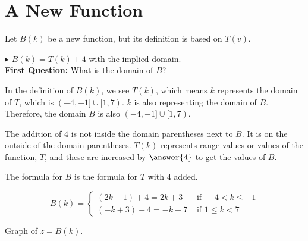 \documentclass{ximera}
\begin{document}
\section{A New Function}

Let $B(k)$ be a new function, but its definition is based on $T(v)$.


$\blacktriangleright$ $B(k) = T(k)+4$ with the implied domain. \\


\textbf{First Question:} What is the domain of $B$?

In the definition of $B(k)$, we see $T(k)$, which means $k$ represents the domain of $T$, which is $(-4,-1] \cup [1,7)$. $k$ is also representing the domain of $B$.  Therefore, the domain $B$ is also $(-4,-1] \cup [1,7)$.


The addition of $4$ is not inside the domain parentheses next to $B$.  It is on the outside of the domain parentheses. $T(k)$ represents range values or values of the function, $T$, and these are increased by $\answer{4}$ to get the values of $B$.





The formula for $B$ is the formula for $T$ with $4$ added.




\[
B(k) = 
\begin{cases}
  (2k-1)+4 = 2k+3 & \text{ if }  -4 < k \leq -1 \\
  (-k+3)+4 = -k+7 & \text{ if } 1 \leq k < 7
\end{cases}
\]








Graph of $z = B(k)$.
\begin{image}
\end{image}
\end{document}
